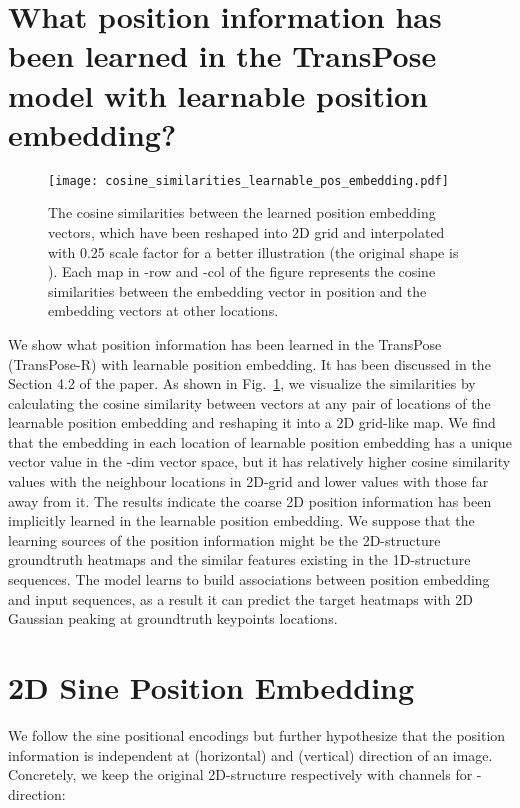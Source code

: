 \documentclass{article}
\begin{document}
{\small


}
\appendix
\section{What position information has been learned in the TransPose model with learnable position embedding?}

\begin{figure}[h]
\begin{center}
\texttt{[image: cosine\_similarities\_learnable\_pos\_embedding.pdf]}
\end{center}
\caption{The cosine similarities between the learned position embedding vectors, which have been reshaped into 2D grid and interpolated with 0.25 scale factor for a better illustration (the original shape is ). Each map in -row and -col of the figure represents the cosine similarities between the embedding vector in position  and the embedding vectors at other locations.}
\label{lpe}
\end{figure}

We show what position information has been learned in the TransPose (TransPose-R) with learnable position embedding. It has been discussed in the Section 4.2 of the paper. As shown in Fig.~\ref{lpe}, we visualize the similarities by calculating the cosine similarity between vectors at any pair of locations of the learnable position embedding and reshaping it into a 2D grid-like map. We find that the embedding in each location of learnable position embedding has a unique vector value in the -dim vector space, but it has relatively higher cosine similarity values with the neighbour locations in 2D-grid and lower values with those far away from it. The results indicate the coarse 2D position information has been implicitly learned in the learnable position embedding. We suppose that the learning sources of the position information might be the 2D-structure groundtruth heatmaps and the similar features existing in the 1D-structure sequences. The model learns to build associations between position embedding and input sequences, as a result it can predict the target heatmaps with 2D Gaussian peaking at groundtruth keypoints locations.


\section{2D Sine Position Embedding}
We follow the sine positional encodings but further hypothesize that the position information is independent at  (horizontal) and  (vertical) direction of an image. Concretely, we keep the original 2D-structure respectively with  channels for -direction:
\end{document}

